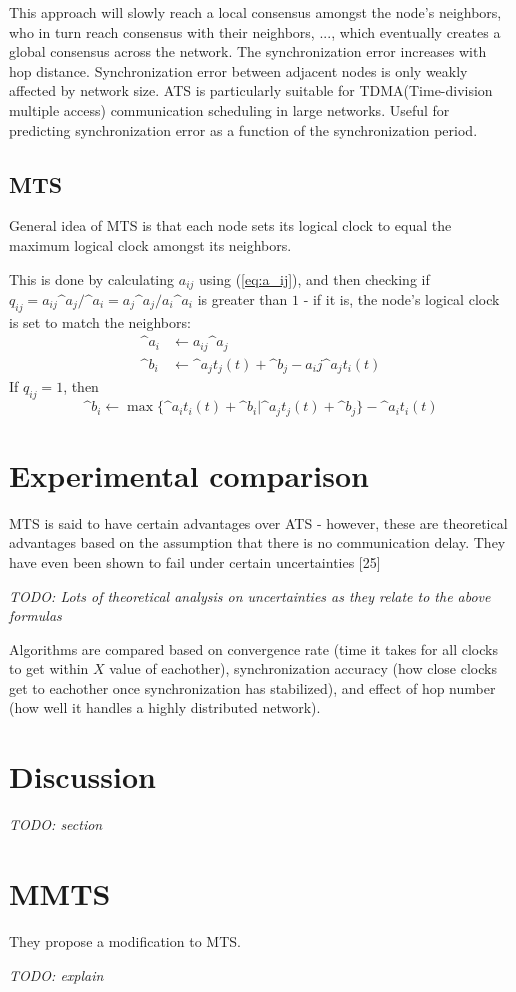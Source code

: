 \documentclass{article}
\begin{document}
This approach will slowly reach a local consensus amongst the node's neighbors, who in turn reach consensus with their neighbors, $...$, which eventually creates a global consensus across the network. The synchronization error increases with hop distance. Synchronization error between adjacent nodes is only weakly affected by network size. ATS is particularly suitable for TDMA(Time-division multiple access) communication scheduling in large networks. Useful for predicting synchronization error as a function of the synchronization period. 

\subsection{MTS}

General idea of MTS is that each node sets its logical clock to equal the maximum logical clock amongst its neighbors.

This is done by calculating $a_{ij}$ using (\ref{eq:a_ij}), and then checking if $q_{ij} = a_{ij} \^{a}_j/\^{a}_i = a_j\^{a}_j / a_i\^{a}_i$ is greater than $1$ - if it is, the node's logical clock is set to match the neighbors:
\begin{align*}
    \^{a}_i &\leftarrow a_{ij}\^{a}_j \\
    \^{b}_i &\leftarrow \^{a}_j t_j(t) + \^{b}_j - a_ij \^a_j t_i(t)
\end{align*}
If $q_{ij} = 1$, then
$$ \^b_i \leftarrow \max\{\^a_i t_i(t) + \^b_i | \^a_j t_j(t) + \^b_j\} - \^a_i t_i(t) $$

\section{Experimental comparison}

MTS is said to have certain advantages over ATS - however, these are theoretical advantages based on the assumption that there is no communication delay. They have even been shown to fail under certain uncertainties [25]

\textit{TODO: Lots of theoretical analysis on uncertainties as they relate to the above formulas}

Algorithms are compared based on convergence rate (time it takes for all clocks to get within $X$ value of eachother), synchronization accuracy (how close clocks get to eachother once synchronization has stabilized), and effect of hop number (how well it handles a highly distributed network).

\section{Discussion}

\textit{TODO: section}

\section{MMTS}

They propose a modification to MTS.

\textit{TODO: explain}
\end{document}

